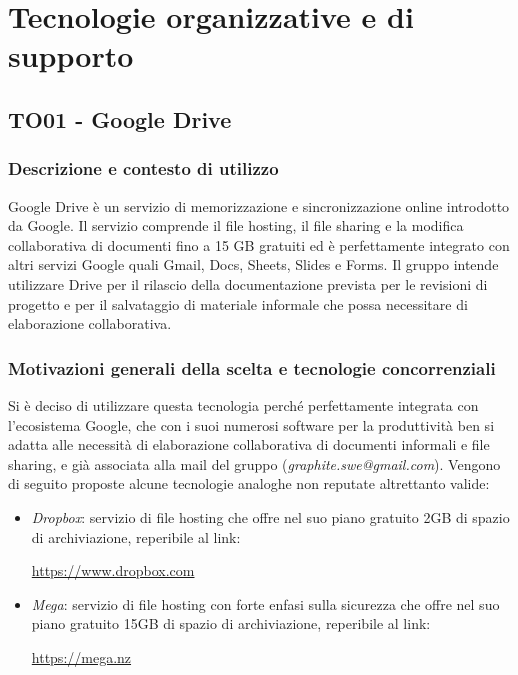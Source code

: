 \documentclass[./../Technology Baseline.tex]{subfiles}
\begin{document}
\section{Tecnologie organizzative e di supporto}

\subsection{TO01 - Google Drive}

\subsubsection{Descrizione e contesto di utilizzo}
Google Drive è un servizio di memorizzazione e sincronizzazione online introdotto da Google. Il servizio comprende il file hosting, il file sharing e la modifica collaborativa di documenti fino a 15 GB gratuiti ed è perfettamente integrato con altri servizi Google quali Gmail, Docs, Sheets, Slides e Forms. Il gruppo intende utilizzare Drive per il rilascio della documentazione prevista per le revisioni di progetto e per il salvataggio di materiale informale che possa necessitare di elaborazione collaborativa.

\subsubsection{Motivazioni generali della scelta e tecnologie concorrenziali}
Si è deciso di utilizzare questa tecnologia perché perfettamente integrata con l'ecosistema Google, che con i suoi numerosi software per la produttività ben si adatta alle necessità di elaborazione collaborativa di documenti informali e file sharing, e già associata alla mail del gruppo (\textit{graphite.swe@gmail.com}). Vengono di seguito proposte alcune tecnologie analoghe non reputate altrettanto valide:

\begin{itemize}
	\item \textit{Dropbox}: servizio di file hosting che offre nel suo piano gratuito 2GB di spazio di archiviazione, reperibile al link:
	\begin{center}
		\url{https://www.dropbox.com}
	\end{center}

	\item \textit{Mega}: servizio di file hosting con forte enfasi sulla sicurezza che offre nel suo piano gratuito 15GB di spazio di archiviazione, reperibile al link:
	\begin{center}
		\url{https://mega.nz}
	\end{center}
\end{itemize}
\end{document}
